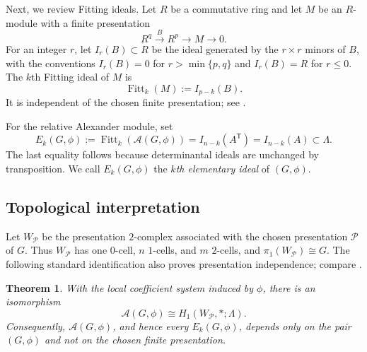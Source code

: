 \documentclass{article}
\theoremstyle{definition}
\theoremstyle{plain}
\newtheorem{theorem}[definition]{Theorem}
\newcommand{\Fitt}{\operatorname{Fitt}}
\begin{document}
Next, we review Fitting ideals.
Let \(R\) be a commutative ring and let \(M\) be an \(R\)-module with a
finite presentation
\[
R^q\xrightarrow{\;B\;}R^p
 \longrightarrow M
 \longrightarrow 0.
\]
For an integer \(r\), let \(I_r(B)\subset R\) be the ideal generated by the
\(r\times r\) minors of \(B\), with the conventions
\(I_r(B)=0\) for \(r>\min\{p,q\}\) and \(I_r(B)=R\) for \(r\le0\).
The \(k\)th Fitting ideal of \(M\) is
\[
\Fitt_k(M):=I_{p-k}(B).
\]
It is independent of the chosen finite presentation; see
\cite[\S20]{Eis1}.

For the relative Alexander module, set
\[
E_k(G,\phi)
 :=\Fitt_k(\mathcal A(G,\phi))
 =I_{n-k}(A^{\mathsf T})
 =I_{n-k}(A)
 \subset\Lambda.
\]
The last equality follows because determinantal ideals are unchanged by
transposition. We call \(E_k(G,\phi)\) the \emph{\(k\)th elementary ideal} of
\((G,\phi)\).

\subsection{Topological interpretation}\label{subsec:topological-meaning}

Let \(W_{\mathcal{P}}\) be the presentation \(2\)-complex associated with the chosen
presentation $\mathcal{P}$ of \(G\). Thus \(W_{\mathcal{P}}\) has one \(0\)-cell, \(n\) \(1\)-cells,
and \(m\) \(2\)-cells, and \(\pi_1(W_{\mathcal{P}})\cong G\). The following standard
identification also proves presentation independence; compare
\cite{CF,Fox1953,Lyn}.

\begin{theorem}\label{thm:CF-invariance}
With the local coefficient system induced by \(\phi\), there is an
isomorphism
\[
\mathcal A(G,\phi)\cong H_1(W_{\mathcal{P}},*;\Lambda).
\]
Consequently, \(\mathcal A(G,\phi)\), and hence every \(E_k(G,\phi)\),
depends only on the pair \((G,\phi)\) and not on the chosen finite
presentation.
\end{theorem}
\end{document}
